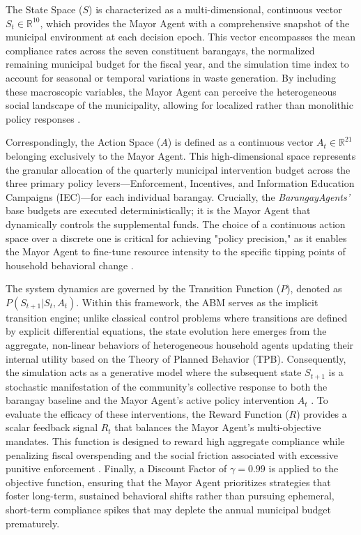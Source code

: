 The State Space ($S$) is characterized as a multi-dimensional, continuous vector $S_t \in \mathbb{R}^{10}$, which provides the Mayor Agent with a comprehensive snapshot of the municipal environment at each decision epoch. This vector encompasses the mean compliance rates across the seven constituent barangays, the normalized remaining municipal budget for the fiscal year, and the simulation time index to account for seasonal or temporal variations in waste generation. By including these macroscopic variables, the Mayor Agent can perceive the heterogeneous social landscape of the municipality, allowing for localized rather than monolithic policy responses \citep{HaMinh2025}. 

Correspondingly, the Action Space ($A$) is defined as a continuous vector $A_t \in \mathbb{R}^{21}$ belonging exclusively to the Mayor Agent. This high-dimensional space represents the granular allocation of the quarterly municipal intervention budget across the three primary policy levers—Enforcement, Incentives, and Information Education Campaigns (IEC)—for each individual barangay. Crucially, the \textit{BarangayAgents'} base budgets are executed deterministically; it is the Mayor Agent that dynamically controls the supplemental funds. The choice of a continuous action space over a discrete one is critical for achieving "policy precision," as it enables the Mayor Agent to fine-tune resource intensity to the specific tipping points of household behavioral change \citep{Rajesh2025}.

The system dynamics are governed by the Transition Function ($P$), denoted as $P(S_{t+1} | S_t, A_t)$. Within this framework, the ABM serves as the implicit transition engine; unlike classical control problems where transitions are defined by explicit differential equations, the state evolution here emerges from the aggregate, non-linear behaviors of heterogeneous household agents updating their internal utility based on the Theory of Planned Behavior (TPB). Consequently, the simulation acts as a generative model where the subsequent state $S_{t+1}$ is a stochastic manifestation of the community’s collective response to both the barangay baseline and the Mayor Agent's active policy intervention $A_t$ \citep{TianReview2024, Jimenez2025}. To evaluate the efficacy of these interventions, the Reward Function ($R$) provides a scalar feedback signal $R_t$ that balances the Mayor Agent’s multi-objective mandates. This function is designed to reward high aggregate compliance while penalizing fiscal overspending and the social friction associated with excessive punitive enforcement \citep{Dey2025}. Finally, a Discount Factor of $\gamma = 0.99$ is applied to the objective function, ensuring that the Mayor Agent prioritizes strategies that foster long-term, sustained behavioral shifts rather than pursuing ephemeral, short-term compliance spikes that may deplete the annual municipal budget prematurely.

